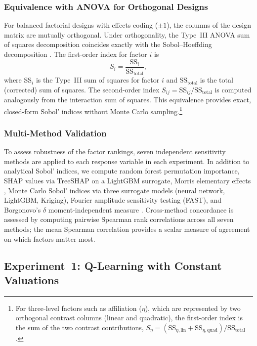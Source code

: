 \subsubsection{Equivalence with ANOVA for Orthogonal Designs}

For balanced factorial designs with effects coding ($\pm 1$), the columns of the design matrix are mutually orthogonal. Under orthogonality, the Type~III ANOVA sum of squares decomposition coincides exactly with the Sobol--Hoeffding decomposition \citep{Saltelli2008}. The first-order index for factor $i$ is
\begin{equation}
S_i = \frac{\mathrm{SS}_i}{\mathrm{SS}_{\mathrm{total}}},
\end{equation}
where $\mathrm{SS}_i$ is the Type~III sum of squares for factor $i$ and $\mathrm{SS}_{\mathrm{total}}$ is the total (corrected) sum of squares. The second-order index $S_{ij} = \mathrm{SS}_{ij} / \mathrm{SS}_{\mathrm{total}}$ is computed analogously from the interaction sum of squares. This equivalence provides exact, closed-form Sobol' indices without Monte Carlo sampling.\footnote{For three-level factors such as affiliation ($\eta$), which are represented by two orthogonal contrast columns (linear and quadratic), the first-order index is the sum of the two contrast contributions, $S_\eta = (\mathrm{SS}_{\eta,\mathrm{lin}} + \mathrm{SS}_{\eta,\mathrm{quad}}) / \mathrm{SS}_{\mathrm{total}}$.}

\subsubsection{Multi-Method Validation}

To assess robustness of the factor rankings, seven independent sensitivity methods are applied to each response variable in each experiment. In addition to analytical Sobol' indices, we compute random forest permutation importance, SHAP values via TreeSHAP on a LightGBM surrogate, Morris elementary effects \citep{Morris1991}, Monte Carlo Sobol' indices via three surrogate models (neural network, LightGBM, Kriging), Fourier amplitude sensitivity testing (FAST), and Borgonovo's $\delta$ moment-independent measure \citep{Borgonovo2007}. Cross-method concordance is assessed by computing pairwise Spearman rank correlations across all seven methods; the mean Spearman correlation provides a scalar measure of agreement on which factors matter most.

\subsection{Experiment~1: Q-Learning with Constant Valuations}
\label{sec:sens_exp1}

